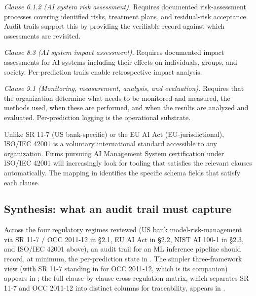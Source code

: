 \textit{Clause 6.1.2 (AI system risk assessment).} Requires documented risk-assessment processes covering identified risks, treatment plans, and residual-risk acceptance. Audit trails support this by providing the verifiable record against which assessments are revisited.

\textit{Clause 8.3 (AI system impact assessment).} Requires documented impact assessments for AI systems including their effects on individuals, groups, and society. Per-prediction trails enable retrospective impact analysis.

\textit{Clause 9.1 (Monitoring, measurement, analysis, and evaluation).} Requires that the organization determine what needs to be monitored and measured, the methods used, when these are performed, and when the results are analyzed and evaluated. Per-prediction logging is the operational substrate.

Unlike SR 11-7 (US bank-specific) or the EU AI Act (EU-jurisdictional), ISO/IEC 42001 is a voluntary international standard accessible to any organization. Firms pursuing AI Management System certification under ISO/IEC 42001 will increasingly look for tooling that satisfies the relevant clauses automatically. The mapping in  identifies the specific schema fields that satisfy each clause.

\subsection{Synthesis: what an audit trail must capture}\label{sec:requirements}

Across the four regulatory regimes reviewed (US bank model-risk-management via SR 11-7 / OCC 2011-12 in §2.1, EU AI Act in §2.2, NIST AI 100-1 in §2.3, and ISO/IEC 42001 above), an audit trail for an ML inference pipeline should record, at minimum, the per-prediction state in . The simpler three-framework view (with SR 11-7 standing in for OCC 2011-12, which is its companion) appears in ; the full clause-by-clause cross-regulation matrix, which separates SR 11-7 and OCC 2011-12 into distinct columns for traceability, appears in .

